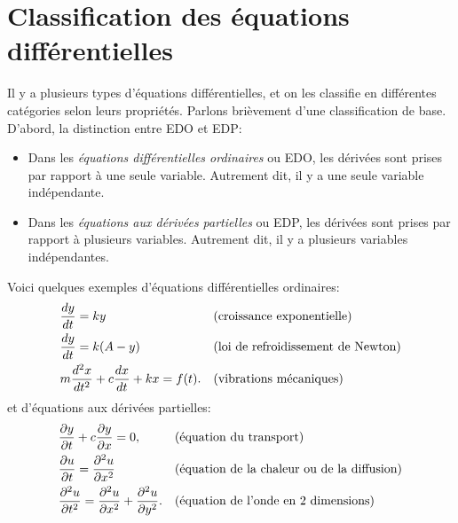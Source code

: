 \sectionnewpage
\section{Classification des équations différentielles}
\label{classification:section}

Il y a plusieurs types d'équations différentielles, et on les classifie en différentes catégories selon leurs propriétés.  Parlons brièvement d'une classification de base.  D'abord, la distinction entre EDO et EDP:
\begin{itemize}
\item
	Dans les \emph{équations différentielles ordinaires} ou EDO, les dérivées sont prises par rapport à une seule variable.  Autrement dit, il y a une seule variable indépendante.

\item
	Dans les \emph{équations aux dérivées partielles} ou EDP, les dérivées sont prises par rapport à plusieurs variables.  Autrement dit, il y a plusieurs variables indépendantes.
\end{itemize}

Voici quelques exemples d'équations différentielles ordinaires:
\begin{align*}
	& \frac{d y}{dt} = ky  & & \text{(croissance exponentielle\index{exponential growth})} \\
	& \frac{d y}{dt} = k(A-y)  & & \text{(\myindex{loi de refroidissement de Newton})} \\
	& m \frac{d^2 x}{dt^2} + c \frac{dx}{dt} + kx = f(t) . & &
\text{(vibrations mécaniques\index{mechanical vibrations})}
\end{align*}
et d'équations aux dérivées partielles:
\begin{align*}
	& \frac{\partial y}{\partial t} + c \frac{\partial y}{\partial x} = 0 ,& & 
		\text{(équation du transport\index{Équation du transport})} \\
	& \frac{\partial u}{\partial t} = \frac{\partial^2 u}{\partial x^2}  & & 
		\text{(équation de la chaleur ou de la diffusion\index{Équation de la chaleur/diffusion})} \\
	& \frac{\partial^2 u}{\partial t^2} = \frac{\partial^2 u}{\partial x^2} + \frac{\partial^2 u}{\partial y^2} . & & 
		\text{(équation de l'onde en 2 dimensions\index{Équation de l'onde en deux dimensions})}
\end{align*}

